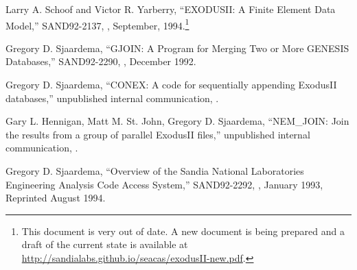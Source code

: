 \begin{thebibliography}{9}

Larry A. Schoof and Victor R. Yarberry,
``EXODUSII: A Finite Element Data Model,''
SAND92-2137,
\SNLA,
September, 1994.\footnote{This document is very out of date.  A new
document is being prepared and a draft of the current state is
available at \url{http://sandialabs.github.io/seacas/exodusII-new.pdf}.}

Gregory D. Sjaardema,
``GJOIN: A Program for Merging Two or More GENESIS Databases,''
SAND92-2290,
\SNLA,
December 1992.

Gregory D. Sjaardema,
``CONEX: A code for sequentially appending ExodusII databases,''
unpublished internal communication,
\SNLA.

Gary L. Hennigan, Matt M. St. John, Gregory D. Sjaardema,
``NEM\_JOIN: Join the results from a group of parallel ExodusII files,''
unpublished internal communication,
\SNLA.

Gregory D. Sjaardema,
``Overview of the Sandia National Laboratories Engineering Analysis Code Access System,''
SAND92-2292,
\SNLA,
January 1993, Reprinted August 1994.
\end{thebibliography}
